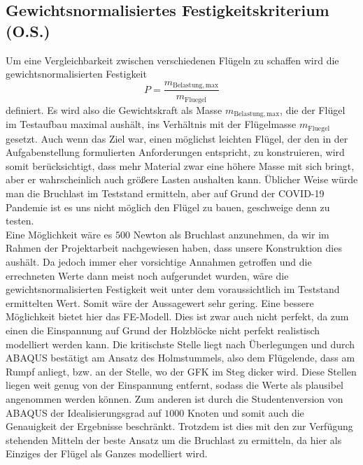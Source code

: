 \subsection{Gewichtsnormalisiertes Festigkeitskriterium (O.S.)}
Um eine Vergleichbarkeit zwischen verschiedenen Flügeln zu schaffen wird die gewichtsnormalisierten Festigkeit
\begin{equation}
	P=\frac{m_{\mathrm{Belastung,max}}}{m_{\mathrm{Fluegel}}}
\end{equation}
definiert. Es wird also die Gewichtskraft als Masse $m_{\mathrm{Belastung,max}}$, die der Flügel im Testaufbau maximal aushält, ins Verhältnis mit der Flügelmasse $m_{\mathrm{Fluegel}}$ gesetzt. Auch wenn das Ziel war, einen möglichst leichten Flügel, der den in der Aufgabenstellung formulierten Anforderungen entspricht, zu konstruieren, wird somit berücksichtigt, dass mehr Material zwar eine höhere Masse mit sich bringt, aber er wahrscheinlich auch größere Lasten aushalten kann. Üblicher Weise würde man die Bruchlast im Teststand ermitteln, aber auf Grund der COVID-19 Pandemie ist es uns nicht möglich den Flügel zu bauen, geschweige denn zu testen.\\
	
\noindent Eine Möglichkeit wäre es $500$ Newton als Bruchlast anzunehmen, da wir im Rahmen der Projektarbeit nachgewiesen haben, dass unsere Konstruktion dies aushält. Da jedoch immer eher vorsichtige Annahmen getroffen und die errechneten Werte dann meist noch aufgerundet wurden, wäre die gewichtsnormalisierten Festigkeit weit unter dem voraussichtlich im Teststand ermittelten Wert. Somit wäre der Aussagewert sehr gering.
Eine bessere Möglichkeit bietet hier das FE-Modell. Dies ist zwar auch nicht perfekt, da zum einen die Einspannung auf Grund der Holzblöcke nicht perfekt realistisch modelliert werden kann. Die kritischste Stelle liegt nach Überlegungen und durch ABAQUS bestätigt am Ansatz des Holmstummels, also dem Flügelende, dass am Rumpf anliegt, bzw. an der Stelle, wo der GFK im Steg dicker wird. Diese Stellen liegen weit genug von der Einspannung entfernt, sodass die Werte als plausibel angenommen werden können. Zum anderen ist durch die Studentenversion von ABAQUS der Idealisierungsgrad auf $1000$ Knoten und somit auch die Genauigkeit der Ergebnisse beschränkt. Trotzdem ist dies mit den zur Verfügung stehenden Mitteln der beste Ansatz um die Bruchlast zu ermitteln, da hier als Einziges der Flügel als Ganzes modelliert wird.\\

